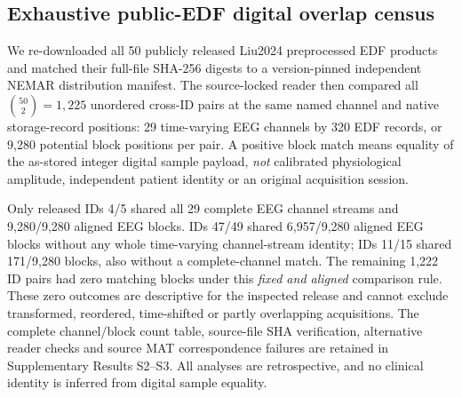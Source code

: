 \subsection{Exhaustive public-EDF digital overlap census}
\label{sec:p2-main-census}
We re-downloaded all 50 publicly released Liu2024 preprocessed
EDF products and matched their full-file SHA-256 digests to a
version-pinned independent NEMAR distribution manifest. The
source-locked reader then compared all $\binom{50}{2}=1,225$
unordered cross-ID pairs at the same named channel and native
storage-record positions: 29 time-varying EEG channels by 320 EDF
records, or 9,280 potential block positions per pair. A positive
block match means equality of the as-stored integer digital
sample payload, \emph{not} calibrated physiological amplitude,
independent patient identity or an original acquisition session.

Only released IDs 4/5 shared all 29 complete EEG channel
streams and 9,280/9,280 aligned EEG blocks. IDs 47/49 shared
6,957/9,280 aligned EEG blocks without any whole time-varying
channel-stream identity; IDs 11/15 shared 171/9,280 blocks,
also without a complete-channel match. The remaining 1,222
ID pairs had zero matching blocks under this \emph{fixed and
aligned} comparison rule. These zero outcomes are descriptive
for the inspected release and cannot exclude transformed,
reordered, time-shifted or partly overlapping acquisitions.
The complete channel/block count table, source-file SHA
verification, alternative reader checks and source MAT
correspondence failures are retained in Supplementary Results
S2--S3. All analyses are retrospective, and no clinical
identity is inferred from digital sample equality.
